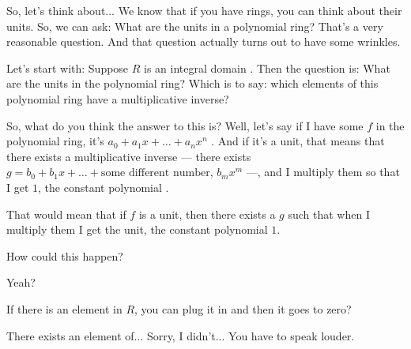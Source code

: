 \begin{speech}[00:16:30 - 00:18:16]

So, let's think about... We know that if you have rings, you can think about their units. So, we can ask: What are the units in a polynomial ring? That's a very reasonable question. And that question actually turns out to have some wrinkles.

Let's start with: Suppose $R$ is an integral domain . Then the question is: What are the units in the polynomial ring?  Which is to say: which elements of this polynomial ring have a multiplicative inverse?

So, what do you think the answer to this is? Well, let's say if I have some $f$ in the polynomial ring, it's $a_0 + a_1 x + \dots + a_n x^n$ . And if it's a unit, that means that there exists a multiplicative inverse --- there exists $g = b_0 + b_1 x + \dots + \text{some different number, } b_m x^m$  ---, and I multiply them so that I get $1$, the constant polynomial .

That would mean that if $f$ is a unit, then there exists a $g$ such that when I multiply them I get the unit, the constant polynomial $1$.

How could this happen?

Yeah?
\end{speech}

\begin{student}
If there is an element in $R$, you can plug it in and then it goes to zero?
\end{student}

\begin{speech}[00:18:21 - 00:18:25]
There exists an element of... Sorry, I didn't... You have to speak louder.
\end{speech}

